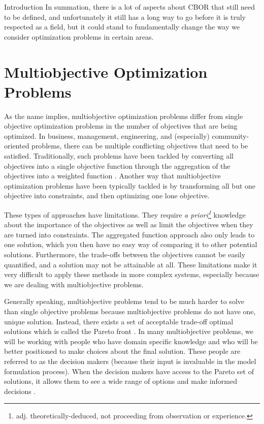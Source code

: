 \documentclass[12pt]{pom_thesis}
\theoremstyle{definition}
\begin{document}
\begin{chapter}{Introduction}
	In summation, there is a lot of aspects about CBOR that still need to be defined, and unfortunately it still has a long way to go before it is truly respected as a field, but it could stand to fundamentally change the way we consider optimization problems in certain areas.
%
%
\section{Multiobjective Optimization Problems}
As the name implies, multiobjective optimization problems differ from single objective optimization problems in the number of objectives that are being optimized. In business, management, engineering, and (especially) community-oriented problems, there can be multiple conflicting objectives that need to be satisfied. Traditionally, such problems have been tackled by converting all objectives into a single objective function through the aggregation of the objectives into a weighted function \cite{pareto-mo}. Another way that multiobjective optimization problems have been typically tackled is by transforming all but one objective into constraints, and then optimizing one lone objective. 

	These types of approaches have limitations. They require \textit{a priori\footnote{adj. theoretically-deduced, not proceeding from observation or experience.}} knowledge about the importance of the objectives as well as limit the objectives when they are turned into constraints. The aggregated function approach also only leads to one solution, which you then have no easy way of comparing it to other potential solutions. Furthermore, the trade-offs between the objectives cannot be easily quantified, and a solution may not be attainable at all. These limitations make it very difficult to apply these methods in more complex systems, especially because we are dealing with multiobjective problems.
	
	Generally speaking, multiobjective problems tend to be much harder to solve than single objective problems because multiobjective problems do not have one, unique solution. Instead, there exists a set of acceptable trade-off optimal solutions which is called the Pareto front \cite{pareto-mo}. In many multiobjective problems, we will be working with people who have domain specific knowledge and who will be better positioned to make choices about the final solution. These people are referred to as the decision makers (because their input is invaluable in the model formulation process). When the decision makers have access to the Pareto set of solutions, it allows them to see a wide range of options and make informed decisions \cite{pareto-mo}. 
	

\end{chapter}
\end{document}
